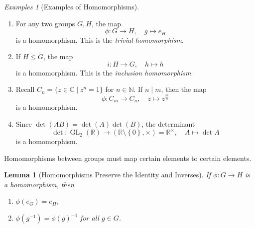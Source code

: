 \documentclass{article}
\newtheorem{lemma}[theorem]{Lemma}
\theoremstyle{definition}
\theoremstyle{remark}
\newcommand{\pqty}[1]{\left(#1\right)}
\newcommand{\Bqty}[1]{\left\{#1\right\}}
\newcommand{\set}[2]{\{#1\mid #2\}}
\newcommand{\functiondomain}[3]{#1:#2\to #3}
\newcommand{\function}[5]{#1:#2\to #3,\quad #4\mapsto #5}
\newcommand{\inverse}{^{-1}}
\newcommand{\multiplicative}{^{\times}}
\newcommand{\subgroup}{\leq}
\newcommand{\divides}{\mid}
\newcommand{\RR}{\mathbb{R}}
\newcommand{\CC}{\mathbb{C}}
\newcommand{\NN}{\mathbb{N}}
\newcommand{\GL}{\operatorname{GL}}
\newtheorem*{examples*}{Examples}
\begin{document}
\begin{examples*}[Examples of Homomorphisms]
    \begin{enumerate}
        \item For any two groups \(G, H\), the map
        \[
            \function{\phi}{G}{H}{g}{e_{H}}
        \]
        is a homomorphism. This is the \emph{trivial homomorphism}.
        
        \item If \(H \subgroup G\), the map
        \[
            \function{i}{H}{G}{h}{h}
        \]
        is a homomorphism. This is the \emph{inclusion homomorphism}.

        \item Recall \(C_n = \set{z \in \CC}{z^n = 1}\) for \(n \in \NN\). If \(n \divides m\), then the map
        \[
            \function{\phi}{C_m}{C_n}{z}{z^{\frac{m}{n}}}
        \]
        is a homomorphism.

        \item Since \(\det \pqty{AB} = \det \pqty{A} \det \pqty{B}\), the determinant
        \[
            \function{\det}{\GL_2\pqty{\RR}}{\pqty{\RR \setminus \Bqty{0}, \times} = \RR\multiplicative}{A}{\det A}
        \]
        is a homomorphism.
    \end{enumerate}
\end{examples*}

Homomorphisms between groups must map certain elements to certain elements.

\begin{lemma}[Homomorphisms Preserve the Identity and Inverses]
    \label{lem:homomorphism-preserve-identity-inverse}%
    If \(\functiondomain{\phi}{G}{H}\) is a homomorphism, then
    \begin{enumerate}
        \item \(\phi\pqty{e_G} = e_H\),
        \item \(\phi\pqty{g\inverse} = \phi\pqty{g}\inverse\) for all \(g \in G\).
    \end{enumerate}
\end{lemma}
\end{document}

